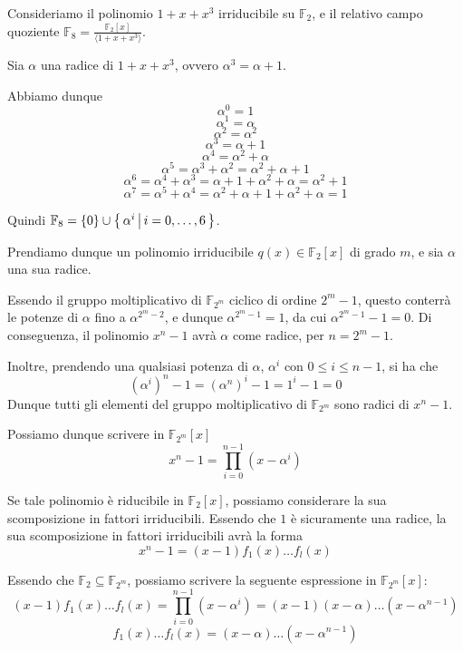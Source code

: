 \begin{example}{}
  Consideriamo il polinomio \(1+x+x^3\) irriducibile su \(\mathbb{F}_2\), e il relativo campo quoziente \(\mathbb{F}_8 = \frac{\mathbb{F}_2[x]}{\langle 1 + x +x^3 \rangle}\).
  
  Sia \(\alpha\) una radice di \(1+x+x^3\), ovvero \(\alpha^3= \alpha + 1\).

  Abbiamo dunque
  \[\alpha^0 = 1\]
  \[\alpha^1 = \alpha\]
  \[\alpha^2 = \alpha^2\]
  \[\alpha^3 = \alpha + 1\]
  \[\alpha^4 = \alpha^2+\alpha\]
  \[\alpha^5 = \alpha^3 + \alpha^2 = \alpha^2+\alpha+1\]
  \[\alpha^6 = \alpha^4 + \alpha^3 = \alpha + 1 + \alpha^2 + \alpha = \alpha^2 + 1\]
  \[\alpha^7 = \alpha^5 + \alpha^4 = \alpha^2+\alpha+1+\alpha^2+\alpha = 1\]

  Quindi \(\mathbb{F}_8 = \set{0} \cup \set{\alpha^i}[i=0,\ldots,6]\). 
\end{example}

Prendiamo dunque un polinomio irriducibile \(q(x) \in \mathbb{F}_2[x]\) di grado \(m\), e sia \(\alpha\) una sua radice.

Essendo il gruppo moltiplicativo di \(\mathbb{F}_{2^m}\) ciclico di ordine \(2^m-1\), questo conterrà le potenze di \(\alpha\) fino a \(\alpha^{2^m-2}\), e dunque \(\alpha^{2^m-1} = 1\), da cui \(\alpha^{2^m-1}-1=0\).
Di conseguenza, il polinomio \(x^{n}-1\) avrà \(\alpha\) come radice, per \(n = 2^m -1\).

Inoltre, prendendo una qualsiasi potenza di \(\alpha\), \(\alpha^i\) con \(0 \leq i \leq n-1\), si ha che
\[{(\alpha^i)}^n - 1 = {(\alpha^n)}^i - 1 = 1^i - 1 = 0\]
Dunque tutti gli elementi del gruppo moltiplicativo di \(\mathbb{F}_{2^m}\) sono radici di \(x^n - 1\).

Possiamo dunque scrivere in \(\mathbb{F}_{2^m}[x]\)
\[x^n - 1 = \prod_{i=0}^{n-1} (x - \alpha^i)\]

Se tale polinomio è riducibile in \(\mathbb{F}_2[x]\), possiamo considerare la sua scomposizione in fattori irriducibili. Essendo che \(1\) è sicuramente una radice, la sua scomposizione in fattori irriducibili avrà la forma
\[x^n - 1 = (x-1)f_1(x)\ldots f_l(x)\]

Essendo che \(\mathbb{F}_2 \subseteq \mathbb{F}_{2^m}\), possiamo scrivere la seguente espressione in \(\mathbb{F}_{2^m}[x]\):
\[(x-1)f_1(x)\ldots f_l(x) = \prod_{i=0}^{n-1} (x - \alpha^i) = (x-1)(x-\alpha)\ldots(x-\alpha^{n-1})\]
\[f_1(x)\ldots f_l(x) = (x-\alpha)\ldots(x-\alpha^{n-1})\]

